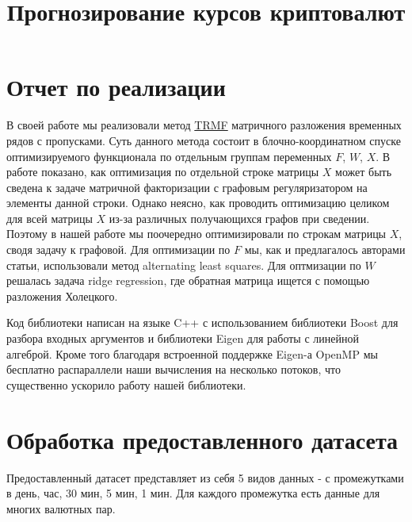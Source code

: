 \documentclass[11pt]{article}
\title{\textbf{Прогнозирование курсов криптовалют}}
\begin{document}
\maketitle

\section{Отчет по реализации}

В своей работе мы реализовали метод \href{http://www.cs.utexas.edu/~rofuyu/papers/tr-mf-nips.pdf}{TRMF} матричного разложения временных рядов с пропусками. Суть данного метода состоит в блочно-координатном спуске оптимизируемого функционала по отдельным группам переменных $F$, $W$, $X$. В работе показано, как оптимизация по отдельной строке матрицы $X$ может быть сведена к задаче матричной факторизации с графовым регуляризатором на элементы данной строки. Однако неясно, как проводить оптимизацию целиком для всей матрицы $X$ из-за различных получающихся графов при сведении. Поэтому в нашей работе мы поочередно оптимизировали по строкам матрицы $X$, сводя задачу к графовой. Для оптимизации по $F$ мы, как и предлагалось авторами статьи, использовали метод alternating least squares. Для оптмизации по $W$ решалась задача ridge regression, где обратная матрица ищется с помощью разложения Холецкого.

Код библиотеки написан на языке C++ с использованием библиотеки Boost для разбора входных аргументов и библиотеки Eigen для работы с линейной алгеброй. Кроме того благодаря встроенной поддержке Eigen-а OpenMP мы бесплатно распараллели наши вычисления на несколько потоков, что существенно ускорило работу нашей библиотеки.


\section{Обработка предоставленного датасета}
Предоставленный датасет представляет из себя 5 видов данных - с промежутками в день, час, 30 мин, 5 мин, 1 мин. Для каждого промежутка есть данные для многих валютных пар. 
\end{document}
